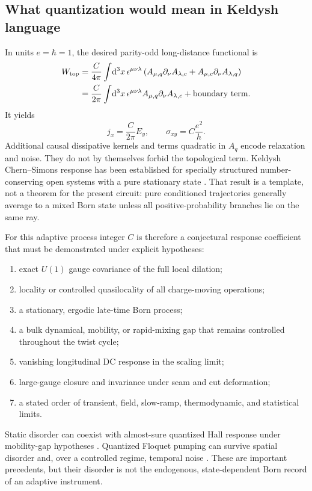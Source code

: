 \documentclass[aps,prb,onecolumn,nofootinbib,superscriptaddress]{revtex4-2}
\newcommand{\dd}{\mathrm{d}}
\begin{document}
\subsection{What quantization would mean in Keldysh language}

In units $e=\hbar=1$, the desired parity-odd long-distance functional is
\begin{align}
  W_{\rm top}
  &=\frac{C}{4\pi}\int\!\dd^3x\,
    \epsilon^{\mu\nu\lambda}
    \left(
      A_{\mu,q}\partial_\nu A_{\lambda,c}
      +A_{\mu,c}\partial_\nu A_{\lambda,q}
    \right)\nonumber\\
  &=\frac{C}{2\pi}\int\!\dd^3x\,
    \epsilon^{\mu\nu\lambda}
    A_{\mu,q}\partial_\nu A_{\lambda,c}
    +\text{boundary term}.
  \label{eq:keldysh-chern-simons}
\end{align}
It yields
\begin{equation}
  j_x=\frac{C}{2\pi}E_y,
  \qquad \sigma_{xy}=C\frac{e^2}{h}.
  \label{eq:quantized-hall-response}
\end{equation}
Additional causal dissipative kernels and terms quadratic in $A_q$ encode
relaxation and noise.  They do not by themselves forbid the topological term.
Keldysh Chern--Simons response has been established for specially structured
number-conserving open systems with a pure stationary state
\cite{TonielliBudichAltlandDiehl2020}.  That result is a template, not a theorem
for the present circuit: pure conditioned trajectories generally average to a
mixed Born state unless all positive-probability branches lie on the same ray.

For this adaptive process integer $C$ is therefore a conjectural response
coefficient that must be demonstrated under explicit hypotheses:
\begin{enumerate}
  \item exact $U(1)$ gauge covariance of the full local dilation;
  \item locality or controlled quasilocality of all charge-moving operations;
  \item a stationary, ergodic late-time Born process;
  \item a bulk dynamical, mobility, or rapid-mixing gap that remains controlled
  throughout the twist cycle;
  \item vanishing longitudinal DC response in the scaling limit;
  \item large-gauge closure and invariance under seam and cut deformation;
  \item a stated order of transient, field, slow-ramp, thermodynamic, and
  statistical limits.
\end{enumerate}
Static disorder can coexist with almost-sure quantized Hall response under
mobility-gap hypotheses
\cite{NiuThoulessWu1985,BellissardVanElstSchulzBaldes1994}.  Quantized Floquet
pumping can survive spatial disorder and, over a controlled regime, temporal
noise
\cite{TitumBergRudnerRefaelLindner2016,TimmsSiebererKolodrubetz2021}.
These are important precedents, but their disorder is not the endogenous,
state-dependent Born record of an adaptive instrument.
\end{document}
